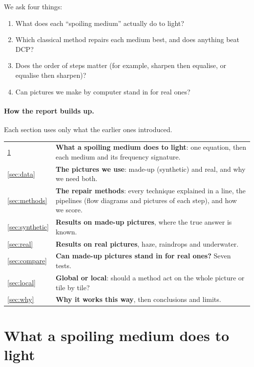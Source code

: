 \documentclass[10pt,a4paper]{article}
\begin{document}
We ask four things:
\begin{enumerate}
\item What does each ``spoiling medium'' actually do to light?
\item Which classical method repairs each medium best, and does anything beat DCP?
\item Does the order of steps matter (for example, sharpen then equalise, or equalise then sharpen)?
\item Can pictures we make by computer stand in for real ones?
\end{enumerate}
\paragraph{How the report builds up.} Each section uses only what the earlier ones introduced.
\begin{center}\small\begin{tabular}{p{1.2cm}p{14.3cm}}\toprule
\ref{sec:media} & \textbf{What a spoiling medium does to light}: one equation, then each medium and its frequency signature.\\
\ref{sec:data} & \textbf{The pictures we use}: made-up (synthetic) and real, and why we need both.\\
\ref{sec:methods} & \textbf{The repair methods}: every technique explained in a line, the pipelines (flow diagrams and pictures of each step), and how we score.\\
\ref{sec:synthetic} & \textbf{Results on made-up pictures}, where the true answer is known.\\
\ref{sec:real} & \textbf{Results on real pictures}, haze, raindrops and underwater.\\
\ref{sec:compare} & \textbf{Can made-up pictures stand in for real ones?} Seven tests.\\
\ref{sec:local} & \textbf{Global or local}: should a method act on the whole picture or tile by tile?\\
\ref{sec:why} & \textbf{Why it works this way}, then conclusions and limits.\\\bottomrule
\end{tabular}\end{center}


\section{What a spoiling medium does to light}\label{sec:media}
\end{document}
